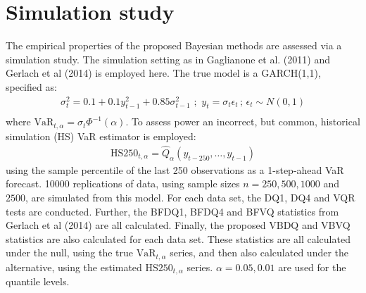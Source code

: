 \documentclass[12pt,epsf]{article}
\begin{document}
%


\section{Simulation study}
The empirical properties of the proposed Bayesian methods are assessed via a simulation study. The simulation setting as in
Gaglianone et al. (2011) and Gerlach et al (2014) is employed here. The true model is a GARCH(1,1), specified as:
\begin{eqnarray*}
\sigma_t^2 = 0.1 + 0.1y_{t-1}^2 + 0.85\sigma_{t-1}^2 \,\,;\,\, y_t = \sigma_t \epsilon_t \,;\, \epsilon_t \sim N(0,1) \\
\end{eqnarray*}
where $\mbox{VaR}_{t,\alpha} = \sigma_t \Phi^{-1}(\alpha)$. To assess power an incorrect, but common, historical simulation (HS)
VaR estimator is employed:
\begin{eqnarray*}
\mbox{HS}250_{t,\alpha} = \hat{Q}_{\alpha}(y_{t-250},\ldots,y_{t-1})
\end{eqnarray*}
using the sample percentile of the last 250 observations as a 1-step-ahead VaR forecast. 10000 replications of data, using sample sizes
$n=250, 500, 1000$ and $2500$, are simulated from this model. For each data set, the DQ1, DQ4 and VQR tests are conducted. Further, the
BFDQ1, BFDQ4 and BFVQ statistics from Gerlach et al (2014) are all calculated. Finally, the proposed VBDQ and VBVQ statistics are
also calculated for each data set. These statistics are all calculated under the null, using the true $\mbox{VaR}_{t,\alpha}$ series,
and then also calculated under the alternative, using the estimated $\mbox{HS}250_{t,\alpha}$ series. $\alpha=0.05, 0.01$ are used for the
quantile levels.
\end{document}
